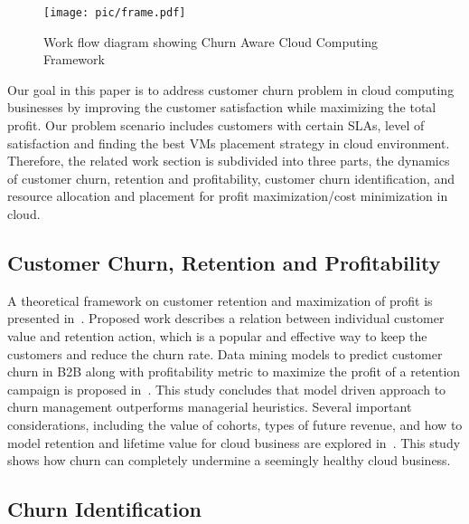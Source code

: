 
\begin{figure*}[!t]
\centering
\texttt{[image: pic/frame.pdf]}
\caption{Work flow diagram showing Churn Aware Cloud Computing Framework}
\label{frame}
\end{figure*}

Our goal in this paper is to address customer churn problem in cloud computing businesses by improving the customer satisfaction while maximizing the total profit. Our problem scenario includes customers with certain SLAs, level of satisfaction and finding the best VMs placement strategy in cloud environment. Therefore, the related work section is subdivided into three parts, the dynamics of customer churn, retention and profitability, customer churn identification, and resource allocation and placement for profit maximization/cost minimization in cloud. 
\subsection{Customer Churn, Retention and Profitability}


A theoretical framework on customer retention and maximization of profit is presented in~\cite{lemmens2013managing}. Proposed work describes a relation between individual customer value and retention action, which is a popular and effective way to keep the customers and reduce the churn rate. Data mining models to predict customer churn in B2B along with profitability metric to maximize the profit of a retention campaign is proposed in~\cite{TamaddoniJahromi20141258}. This study concludes that model driven approach to churn management outperforms managerial heuristics. Several  important  considerations, including  the  value  of  cohorts,  types  of 
future revenue, and how to model retention and lifetime value for cloud business are explored in~\cite{cloudchurn2012}. This study shows how  churn  can  completely  undermine  a  seemingly  healthy cloud business. 


\subsection{Churn Identification}


